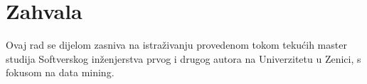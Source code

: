 \documentclass[10pt,conference,a4paper]{IEEEtran}
\begin{document}
\section*{Zahvala}
Ovaj rad se dijelom zasniva na istraživanju provedenom tokom tekućih master
studija Softverskog inženjerstva prvog i drugog autora na Univerzitetu u
Zenici, s fokusom na data mining.

\balance



\end{document}

